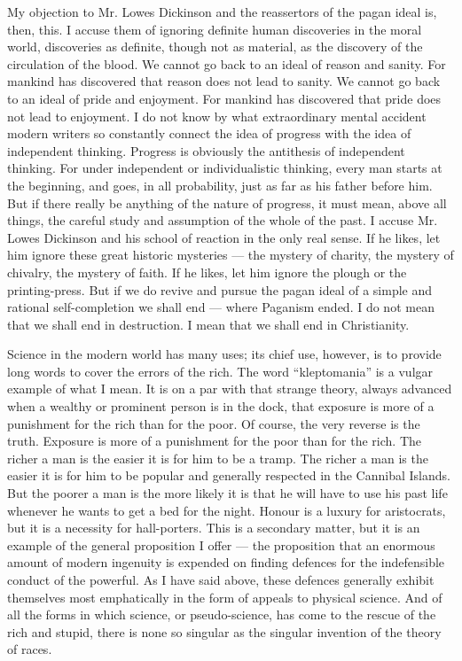 My objection to Mr. Lowes Dickinson and the reassertors of the pagan ideal is, then, this. I accuse them of ignoring definite human discoveries in the moral world, discoveries as definite, though not as material, as the discovery of the circulation of the blood. We cannot go back to an ideal of reason and sanity. For mankind has discovered that reason does not lead to sanity. We cannot go back to an ideal of pride and enjoyment. For mankind has discovered that pride does not lead to enjoyment. I do not know by what extraordinary mental accident modern writers so constantly connect the idea of progress with the idea of independent thinking. Progress is obviously the antithesis of independent thinking. For under independent or individualistic thinking, every man starts at the beginning, and goes, in all probability, just as far as his father before him. But if there really be anything of the nature of progress, it must mean, above all things, the careful study and assumption of the whole of the past. I accuse Mr. Lowes Dickinson and his school of reaction in the only real sense. If he likes, let him ignore these great historic mysteries — the mystery of charity, the mystery of chivalry, the mystery of faith. If he likes, let him ignore the plough or the printing-press. But if we do revive and pursue the pagan ideal of a simple and rational self-completion we shall end — where Paganism ended. I do not mean that we shall end in destruction. I mean that we shall end in Christianity.


Science in the modern world has many uses; its chief use, however, is to provide long words to cover the errors of the rich. The word “kleptomania” is a vulgar example of what I mean. It is on a par with that strange theory, always advanced when a wealthy or prominent person is in the dock, that exposure is more of a punishment for the rich than for the poor. Of course, the very reverse is the truth. Exposure is more of a punishment for the poor than for the rich. The richer a man is the easier it is for him to be a tramp. The richer a man is the easier it is for him to be popular and generally respected in the Cannibal Islands. But the poorer a man is the more likely it is that he will have to use his past life whenever he wants to get a bed for the night. Honour is a luxury for aristocrats, but it is a necessity for hall-porters. This is a secondary matter, but it is an example of the general proposition I offer — the proposition that an enormous amount of modern ingenuity is expended on finding defences for the indefensible conduct of the powerful. As I have said above, these defences generally exhibit themselves most emphatically in the form of appeals to physical science. And of all the forms in which science, or pseudo-science, has come to the rescue of the rich and stupid, there is none so singular as the singular invention of the theory of races.

